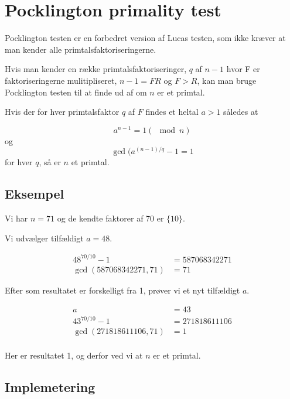 \section{Pocklington primality test}
Pocklington testen er en forbedret version af Lucas testen, som ikke
kræver at man kender alle primtalsfaktoriseringerne.

Hvis man kender en række primtalsfaktoriseringer, $q$ af $n-1$ hvor F er
faktoriseringerne mulitipliseret, $n-1=FR$ og $F>R$, kan man bruge
Pocklington testen til at finde ud af om $n$ er et primtal.


\begin{theorem}

Hvis der for hver primtalsfaktor $q$ af $F$ findes et heltal $a > 1$ således at

\begin{equation}
a^{n-1}=1(\mod n)
\end{equation}
og
\begin{equation}
\gcd(a^{(n-1)/q}-1 = 1
\end{equation}
for hver $q$, så er $n$ et primtal.
\end{theorem}

\subsection{Eksempel}
Vi har $n=71$ og de kendte faktorer af 70 er $\{10\}$.

Vi udvælger tilfældigt $a=48$.

\begin{align*}
48^{70/10}-1 &= 587068342271\\
\gcd(587068342271,71) &= 71
\end{align*}

Efter som resultatet er forskelligt fra 1, prøver vi et nyt tilfældigt $a$.

\begin{align*}
a &= 43\\
43^{70/10}-1 &= 271818611106 \\
\gcd(271818611106,71) &= 1 \\
\end{align*}

Her er resultatet 1, og derfor ved vi at $n$ er et primtal.

\subsection{Implemetering}


